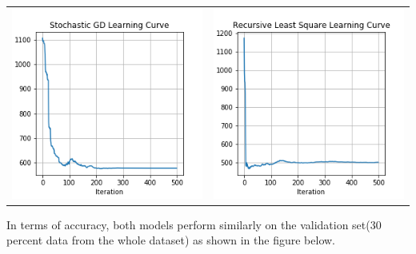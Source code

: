 \documentclass{article}
\begin{document}
\begin{table}[H]
\begin{center}
\begin{tabular}{cc}
\includegraphics[scale=0.5]{MPG-SGD.png} &
\includegraphics[scale=0.5]{MPG-RLS.png}
\end{tabular}
\end{center}
\end{table}

In terms of accuracy, both models perform similarly on the validation set(30 percent data from the whole dataset) as shown in the figure below.
\end{document}
